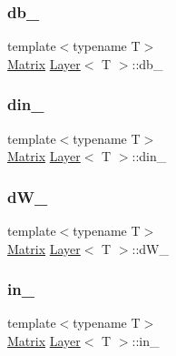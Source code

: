 \mbox{\label{class_layer_a4ff69fa1c45333cbef24f12d190f26a5}} 
\subsubsection{\texorpdfstring{db\_}{db\_}}
{\footnotesize\ttfamily template$<$typename T$>$ \\
\mbox{\hyperlink{class_layer_a22b1e7286096aa62bd245536c8ebdaf1}{Matrix}} \mbox{\hyperlink{class_layer}{Layer}}$<$ T $>$\+::db\+\_\+\hspace{0.3cm}{\ttfamily [protected]}}

\mbox{\label{class_layer_adcac12db650e05e0e5c664c304231604}} 
\subsubsection{\texorpdfstring{din\_}{din\_}}
{\footnotesize\ttfamily template$<$typename T$>$ \\
\mbox{\hyperlink{class_layer_a22b1e7286096aa62bd245536c8ebdaf1}{Matrix}} \mbox{\hyperlink{class_layer}{Layer}}$<$ T $>$\+::din\+\_\+\hspace{0.3cm}{\ttfamily [protected]}}

\mbox{\label{class_layer_ab02d1e3e853bef3aadffc312ba847f44}} 
\subsubsection{\texorpdfstring{dW\_}{dW\_}}
{\footnotesize\ttfamily template$<$typename T$>$ \\
\mbox{\hyperlink{class_layer_a22b1e7286096aa62bd245536c8ebdaf1}{Matrix}} \mbox{\hyperlink{class_layer}{Layer}}$<$ T $>$\+::d\+W\+\_\+\hspace{0.3cm}{\ttfamily [protected]}}

\mbox{\label{class_layer_a9482c992e218f5da65c4345be1dd7447}} 
\subsubsection{\texorpdfstring{in\_}{in\_}}
{\footnotesize\ttfamily template$<$typename T$>$ \\
\mbox{\hyperlink{class_layer_a22b1e7286096aa62bd245536c8ebdaf1}{Matrix}} \mbox{\hyperlink{class_layer}{Layer}}$<$ T $>$\+::in\+\_\+\hspace{0.3cm}{\ttfamily [protected]}}

